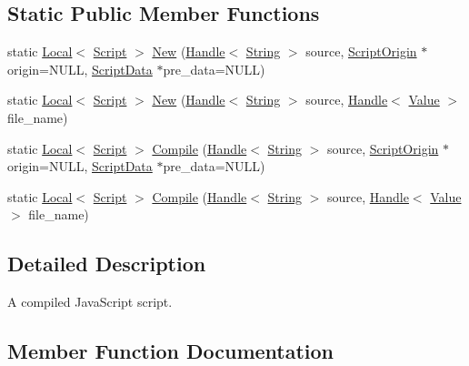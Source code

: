 \subsection*{Static Public Member Functions}
\begin{DoxyCompactItemize}
\item 
static \hyperlink{classv8_1_1_local}{Local}$<$ \hyperlink{classv8_1_1_script}{Script} $>$ \hyperlink{classv8_1_1_script_ae9a59dba778070c0ce265ff1e5dfcbdb}{New} (\hyperlink{classv8_1_1_handle}{Handle}$<$ \hyperlink{classv8_1_1_string}{String} $>$ source, \hyperlink{classv8_1_1_script_origin}{Script\+Origin} $\ast$origin=N\+U\+L\+L, \hyperlink{classv8_1_1_script_data}{Script\+Data} $\ast$pre\+\_\+data=N\+U\+L\+L)
\item 
static \hyperlink{classv8_1_1_local}{Local}$<$ \hyperlink{classv8_1_1_script}{Script} $>$ \hyperlink{classv8_1_1_script_aebbe434ea4df560ffc8eb290f7ac284b}{New} (\hyperlink{classv8_1_1_handle}{Handle}$<$ \hyperlink{classv8_1_1_string}{String} $>$ source, \hyperlink{classv8_1_1_handle}{Handle}$<$ \hyperlink{classv8_1_1_value}{Value} $>$ file\+\_\+name)
\item 
static \hyperlink{classv8_1_1_local}{Local}$<$ \hyperlink{classv8_1_1_script}{Script} $>$ \hyperlink{classv8_1_1_script_a9c1a035de382abb86de8468baa62f8ab}{Compile} (\hyperlink{classv8_1_1_handle}{Handle}$<$ \hyperlink{classv8_1_1_string}{String} $>$ source, \hyperlink{classv8_1_1_script_origin}{Script\+Origin} $\ast$origin=N\+U\+L\+L, \hyperlink{classv8_1_1_script_data}{Script\+Data} $\ast$pre\+\_\+data=N\+U\+L\+L)
\item 
static \hyperlink{classv8_1_1_local}{Local}$<$ \hyperlink{classv8_1_1_script}{Script} $>$ \hyperlink{classv8_1_1_script_a0c56436bbe2b71753e1413bab1f04a6e}{Compile} (\hyperlink{classv8_1_1_handle}{Handle}$<$ \hyperlink{classv8_1_1_string}{String} $>$ source, \hyperlink{classv8_1_1_handle}{Handle}$<$ \hyperlink{classv8_1_1_value}{Value} $>$ file\+\_\+name)
\end{DoxyCompactItemize}


\subsection{Detailed Description}
A compiled Java\+Script script. 

\subsection{Member Function Documentation}
\hypertarget{classv8_1_1_script_a9c1a035de382abb86de8468baa62f8ab}{}
